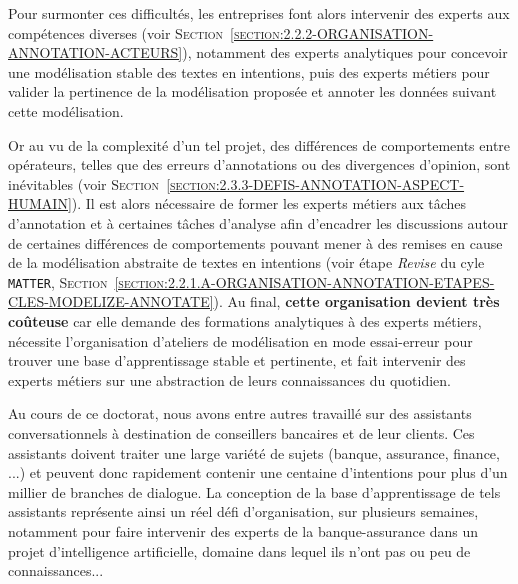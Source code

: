 	Pour surmonter ces difficultés, les entreprises font alors intervenir des experts aux compétences diverses (voir \textsc{Section~\ref{section:2.2.2-ORGANISATION-ANNOTATION-ACTEURS}}), notamment des experts analytiques pour concevoir une modélisation stable des textes en intentions, puis des experts métiers pour valider la pertinence de la modélisation proposée et annoter les données suivant cette modélisation.
	
	
	Or au vu de la complexité d'un tel projet, des différences de comportements entre opérateurs, telles que des erreurs d'annotations ou des divergences d'opinion, sont inévitables (voir \textsc{Section~\ref{section:2.3.3-DEFIS-ANNOTATION-ASPECT-HUMAIN}}).
	Il est alors nécessaire de former les experts métiers aux tâches d'annotation et à certaines tâches d'analyse afin d'encadrer les discussions autour de certaines différences de comportements pouvant mener à des remises en cause de la modélisation abstraite de textes en intentions (voir étape \textit{Revise} du cyle \texttt{MATTER}, \textsc{Section~\ref{section:2.2.1.A-ORGANISATION-ANNOTATION-ETAPES-CLES-MODELIZE-ANNOTATE}}).
	Au final, \textbf{cette organisation devient très coûteuse} car elle demande des formations analytiques à des experts métiers, nécessite l'organisation d'ateliers de modélisation en mode essai-erreur pour trouver une base d'apprentissage stable et pertinente, et fait intervenir des experts métiers sur une abstraction de leurs connaissances du quotidien.
	
	\begin{leftBarExamples}
		Au cours de ce doctorat, nous avons entre autres travaillé sur des assistants conversationnels à destination de conseillers bancaires et de leur clients.
		Ces assistants doivent traiter une large variété de sujets (banque, assurance, finance, ...) et peuvent donc rapidement contenir une centaine d'intentions pour plus d'un millier de branches de dialogue.
		La conception de la base d'apprentissage de tels assistants représente ainsi un réel défi d'organisation, sur plusieurs semaines, notamment pour faire intervenir des experts de la banque-assurance dans un projet d'intelligence artificielle, domaine dans lequel ils n'ont pas ou peu de connaissances...
	\end{leftBarExamples}
	
